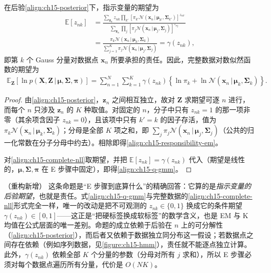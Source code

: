 \documentclass[../../main.tex]{subfiles}
\begin{document}
\begin{proposition}[责任与完整数据对数似然的期望]\label{proposition:ch15-责任与期望}
在后验\eqref{align:ch15-posterior}下，指示变量的期望为
\begin{align}
\mathbb{E}[z_{nk}]
&=\frac{\sum_{\bm{z}_n}z_{nk}\prod_{k'}\left[\pi_{k'}\mathcal{N}(\bm{x}_n\,|\,\bm{\mu}_{k'},\bm{\Sigma}_{k'})\right]^{z_{nk'}}}{\sum_{\bm{z}_n}\prod_{j}\left[\pi_j\mathcal{N}(\bm{x}_n\,|\,\bm{\mu}_j,\bm{\Sigma}_j)\right]^{z_{nj}}}\nonumber\\
&=\frac{\pi_k\mathcal{N}(\bm{x}_n\,|\,\bm{\mu}_k,\bm{\Sigma}_k)}{\sum_{j=1}^{K}\pi_j\mathcal{N}(\bm{x}_n\,|\,\bm{\mu}_j,\bm{\Sigma}_j)}=\gamma(z_{nk}),
\label{align:ch15-responsibility-em}
\end{align}
即第 $k$ 个 Gauss 分量对数据点 $\bm{x}_n$ 所要承担的责任。因此，完整数据对数似然函数的期望为
\begin{align}
\mathbb{E}_{\bm{Z}}\!\left[\ln p(\bm{X},\bm{Z}\,|\,\bm{\mu},\bm{\Sigma},\bm{\pi})\right]=\sum_{n=1}^{N}\sum_{k=1}^{K}\gamma(z_{nk})\!\left\{\ln\pi_k+\ln\mathcal{N}(\bm{x}_n\,|\,\bm{\mu}_k,\bm{\Sigma}_k)\right\}.
\label{align:ch15-q-gmm}
\end{align}
\end{proposition}
\begin{proof}
由\eqref{align:ch15-posterior}，$\bm{z}_n$ 之间相互独立，故对 $\bm{Z}$ 求期望可逐 $n$ 进行，而每个 $n$ 只涉及 $\bm{z}_n$ 的 $K$ 种取值。对固定的 $n$，分子中只有 $z_{nk}=1$ 的那一项非零（其余项含因子 $z_{nk}=0$），且该项中只有 $k'=k$ 的因子存活，值为 $\pi_k\mathcal{N}(\bm{x}_n\,|\,\bm{\mu}_k,\bm{\Sigma}_k)$；分母是全部 $K$ 项之和，即 $\sum_j\pi_j\mathcal{N}(\bm{x}_n\,|\,\bm{\mu}_j,\bm{\Sigma}_j)$（公共的归一化常数在分子分母中约去）。相除即得\eqref{align:ch15-responsibility-em}。

对\eqref{align:ch15-complete-nll}取期望，并把 $\mathbb{E}[z_{nk}]=\gamma(z_{nk})$ 代入（期望是线性的，$\bm{\mu},\bm{\Sigma},\bm{\pi}$ 在 E 步骤中固定），即得\eqref{align:ch15-q-gmm}。
\end{proof}

\begin{remark}（重构新增）
这条命题是“E 步骤到底算什么”的精确回答：它算的是\emph{指示变量的后验期望}，也就是责任。式\eqref{align:ch15-q-gmm}与完整数据的\eqref{align:ch15-complete-nll}形式完全一样，唯一的改动是把不可观测的 $z_{nk}\in\{0,1\}$ 换成它的条件期望 $\gamma(z_{nk})\in[0,1]$——这正是“把硬标签换成软标签”的数学含义，也是 EM 与 K 均值在公式层面的唯一差别。命题的成立依赖于后验在 $n$ 上的可分解性（\eqref{align:ch15-posterior}），而后者又依赖于数据独立同分布这一假设；若数据点之间存在依赖（例如序列数据，见\cref{figure:ch15-hmm}），责任就不能逐点独立计算。此外，$\gamma(z_{nk})$ 依赖全部 $K$ 个分量的参数（分母对所有 $j$ 求和），所以 E 步骤必须对每个数据点遍历所有分量，代价是 $O(NK)$。
\end{remark}
\end{document}
